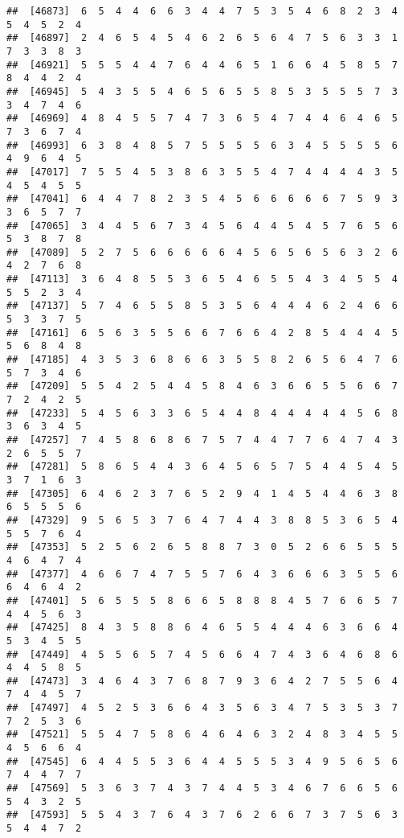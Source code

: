 \documentclass[
]{book}
\begin{document}
\begin{verbatim}
##  [46873]  6  5  4  4  6  6  3  4  4  7  5  3  5  4  6  8  2  3  4  5  4  5  2  4
##  [46897]  2  4  6  5  4  5  4  6  2  6  5  6  4  7  5  6  3  3  1  7  3  3  8  3
##  [46921]  5  5  5  4  4  7  6  4  4  6  5  1  6  6  4  5  8  5  7  8  4  4  2  4
##  [46945]  5  4  3  5  5  4  6  5  6  5  5  8  5  3  5  5  5  7  3  3  4  7  4  6
##  [46969]  4  8  4  5  5  7  4  7  3  6  5  4  7  4  4  6  4  6  5  7  3  6  7  4
##  [46993]  6  3  8  4  8  5  7  5  5  5  5  6  3  4  5  5  5  5  6  4  9  6  4  5
##  [47017]  7  5  5  4  5  3  8  6  3  5  5  4  7  4  4  4  4  3  5  4  5  4  5  5
##  [47041]  6  4  4  7  8  2  3  5  4  5  6  6  6  6  6  7  5  9  3  3  6  5  7  7
##  [47065]  3  4  4  5  6  7  3  4  5  6  4  4  5  4  5  7  6  5  6  5  3  8  7  8
##  [47089]  5  2  7  5  6  6  6  6  6  4  5  6  5  6  5  6  3  2  6  4  2  7  6  8
##  [47113]  3  6  4  8  5  5  3  6  5  4  6  5  5  4  3  4  5  5  4  5  5  2  3  4
##  [47137]  5  7  4  6  5  5  8  5  3  5  6  4  4  4  6  2  4  6  6  5  3  3  7  5
##  [47161]  6  5  6  3  5  5  6  6  7  6  6  4  2  8  5  4  4  4  5  5  6  8  4  8
##  [47185]  4  3  5  3  6  8  6  6  3  5  5  8  2  6  5  6  4  7  6  5  7  3  4  6
##  [47209]  5  5  4  2  5  4  4  5  8  4  6  3  6  6  5  5  6  6  7  7  2  4  2  5
##  [47233]  5  4  5  6  3  3  6  5  4  4  8  4  4  4  4  4  5  6  8  3  6  3  4  5
##  [47257]  7  4  5  8  6  8  6  7  5  7  4  4  7  7  6  4  7  4  3  2  6  5  5  7
##  [47281]  5  8  6  5  4  4  3  6  4  5  6  5  7  5  4  4  5  4  5  3  7  1  6  3
##  [47305]  6  4  6  2  3  7  6  5  2  9  4  1  4  5  4  4  6  3  8  6  5  5  5  6
##  [47329]  9  5  6  5  3  7  6  4  7  4  4  3  8  8  5  3  6  5  4  5  5  7  6  4
##  [47353]  5  2  5  6  2  6  5  8  8  7  3  0  5  2  6  6  5  5  5  4  6  4  7  4
##  [47377]  4  6  6  7  4  7  5  5  7  6  4  3  6  6  6  3  5  5  6  6  4  6  4  2
##  [47401]  5  6  5  5  5  8  6  6  5  8  8  8  4  5  7  6  6  5  7  4  4  5  6  3
##  [47425]  8  4  3  5  8  8  6  4  6  5  5  4  4  4  6  3  6  6  4  5  3  4  5  5
##  [47449]  4  5  5  6  5  7  4  5  6  6  4  7  4  3  6  4  6  8  6  4  4  5  8  5
##  [47473]  3  4  6  4  3  7  6  8  7  9  3  6  4  2  7  5  5  6  4  7  4  4  5  7
##  [47497]  4  5  2  5  3  6  6  4  3  5  6  3  4  7  5  3  5  3  7  7  2  5  3  6
##  [47521]  5  5  4  7  5  8  6  4  6  4  6  3  2  4  8  3  4  5  5  4  5  6  6  4
##  [47545]  6  4  4  5  5  3  6  4  4  5  5  5  3  4  9  5  6  5  6  7  4  4  7  7
##  [47569]  5  3  6  3  7  4  3  7  4  4  5  3  4  6  7  6  6  5  6  5  4  3  2  5
##  [47593]  5  5  4  3  7  6  4  3  7  6  2  6  6  7  3  7  5  6  3  5  4  4  7  2

\end{verbatim}
\end{document}

